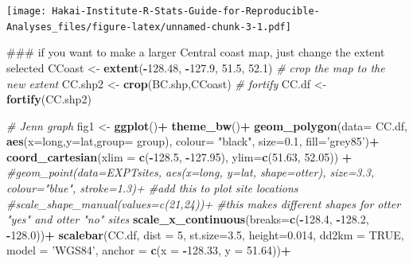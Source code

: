 \documentclass[]{book}
\newenvironment{Shaded}{\begin{snugshade}}{\end{snugshade}}
\newcommand{\KeywordTok}[1]{\textcolor[rgb]{0.13,0.29,0.53}{\textbf{#1}}}
\newcommand{\DataTypeTok}[1]{\textcolor[rgb]{0.13,0.29,0.53}{#1}}
\newcommand{\DecValTok}[1]{\textcolor[rgb]{0.00,0.00,0.81}{#1}}
\newcommand{\FloatTok}[1]{\textcolor[rgb]{0.00,0.00,0.81}{#1}}
\newcommand{\StringTok}[1]{\textcolor[rgb]{0.31,0.60,0.02}{#1}}
\newcommand{\CommentTok}[1]{\textcolor[rgb]{0.56,0.35,0.01}{\textit{#1}}}
\newcommand{\OtherTok}[1]{\textcolor[rgb]{0.56,0.35,0.01}{#1}}
\newcommand{\OperatorTok}[1]{\textcolor[rgb]{0.81,0.36,0.00}{\textbf{#1}}}
\newcommand{\NormalTok}[1]{#1}
\begin{document}
\texttt{[image: Hakai-Institute-R-Stats-Guide-for-Reproducible-Analyses\_files/figure-latex/unnamed-chunk-3-1.pdf]}

\begin{Shaded}
\begin{Highlighting}[]
\NormalTok{### if you want to make a larger Central coast map, just change the extent selected}
\NormalTok{CCoast <-}\StringTok{ }\KeywordTok{extent}\NormalTok{(}\OperatorTok{-}\FloatTok{128.48}\NormalTok{, }\OperatorTok{-}\FloatTok{127.9}\NormalTok{, }\FloatTok{51.5}\NormalTok{, }\FloatTok{52.1}\NormalTok{)}
\CommentTok{# crop the map to the new extent}
\NormalTok{CC.shp2 <-}\StringTok{ }\KeywordTok{crop}\NormalTok{(BC.shp,CCoast)}
\CommentTok{# fortify}
\NormalTok{CC.df <-}\StringTok{ }\KeywordTok{fortify}\NormalTok{(CC.shp2)}

\CommentTok{# Jenn graph}
\NormalTok{fig1 <-}\StringTok{ }\KeywordTok{ggplot}\NormalTok{()}\OperatorTok{+}\StringTok{ }\KeywordTok{theme_bw}\NormalTok{()}\OperatorTok{+}
\StringTok{    }\KeywordTok{geom_polygon}\NormalTok{(}\DataTypeTok{data=}\NormalTok{ CC.df, }\KeywordTok{aes}\NormalTok{(}\DataTypeTok{x=}\NormalTok{long,}\DataTypeTok{y=}\NormalTok{lat,}\DataTypeTok{group=}\NormalTok{ group),}
      \DataTypeTok{colour=} \StringTok{"black"}\NormalTok{, }\DataTypeTok{size=}\FloatTok{0.1}\NormalTok{, }\DataTypeTok{fill=}\StringTok{'grey85'}\NormalTok{)}\OperatorTok{+}
\StringTok{  }\KeywordTok{coord_cartesian}\NormalTok{(}\DataTypeTok{xlim =} \KeywordTok{c}\NormalTok{(}\OperatorTok{-}\FloatTok{128.5}\NormalTok{, }\OperatorTok{-}\FloatTok{127.95}\NormalTok{), }\DataTypeTok{ylim=}\KeywordTok{c}\NormalTok{(}\FloatTok{51.63}\NormalTok{, }\FloatTok{52.05}\NormalTok{)) }\OperatorTok{+}
\StringTok{  }\CommentTok{#geom_point(data=EXPTsites, aes(x=long, y=lat, shape=otter), size=3.3, colour="blue", stroke=1.3)+  #add this to plot site locations}
\StringTok{  }\CommentTok{#scale_shape_manual(values=c(21,24))+       #this makes different shapes for otter "yes" and otter "no" sites}
\StringTok{  }\KeywordTok{scale_x_continuous}\NormalTok{(}\DataTypeTok{breaks=}\KeywordTok{c}\NormalTok{(}\OperatorTok{-}\FloatTok{128.4}\NormalTok{, }\OperatorTok{-}\FloatTok{128.2}\NormalTok{, }\OperatorTok{-}\FloatTok{128.0}\NormalTok{))}\OperatorTok{+}
\StringTok{  }\KeywordTok{scalebar}\NormalTok{(CC.df, }\DataTypeTok{dist =} \DecValTok{5}\NormalTok{, }\DataTypeTok{st.size=}\FloatTok{3.5}\NormalTok{, }\DataTypeTok{height=}\FloatTok{0.014}\NormalTok{, }\DataTypeTok{dd2km =} \OtherTok{TRUE}\NormalTok{, }\DataTypeTok{model =} \StringTok{'WGS84'}\NormalTok{, }\DataTypeTok{anchor =} \KeywordTok{c}\NormalTok{(}\DataTypeTok{x =} \OperatorTok{-}\FloatTok{128.33}\NormalTok{, }\DataTypeTok{y =} \FloatTok{51.64}\NormalTok{))}\OperatorTok{+}

\end{Highlighting}
\end{Shaded}
\end{document}
